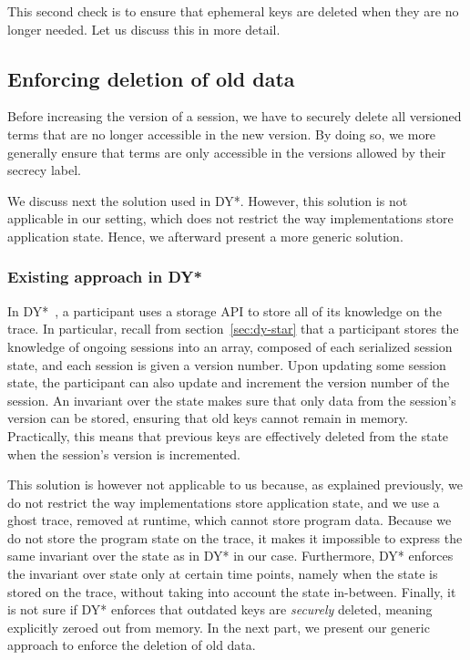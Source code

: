 This second check is to ensure that ephemeral keys are deleted when they are no longer needed. Let us discuss this in more detail.

\subsection{Enforcing deletion of old data}
\label{sec:enforcing-deletion-of-old-data}

Before increasing the version of a session, we have to securely delete all versioned terms that are no longer accessible in the new version. By doing so, we more generally ensure that terms are only accessible in the versions allowed by their secrecy label.

We discuss next the solution used in DY*. However, this solution is not applicable in our setting, which does not restrict the way implementations store application state. Hence, we afterward present a more generic solution.

\subsubsection{Existing approach in DY*}
\label{sec:existing-approach-in-dy}

In DY*~\cite{bhargavan2021text}, a participant uses a storage API to store all of its knowledge on the trace.
In particular, recall from section~\ref{sec:dy-star} that a participant stores the knowledge of ongoing sessions into an array, composed of each serialized session state, and each session is given a version number.
Upon updating some session state, the participant can also update and increment the version number of the session.
An invariant over the state makes sure that only data from the session's version can be stored, ensuring that old keys cannot remain in memory.
Practically, this means that previous keys are effectively deleted from the state when the session's version is incremented.

This solution is however not applicable to us because, as explained previously, we do not restrict the way implementations store application state, and we use a ghost trace, removed at runtime, which cannot store program data.
Because we do not store the program state on the trace, it makes it impossible to express the same invariant over the state as in DY* in our case.
Furthermore, DY* enforces the invariant over state only at certain time points, namely when the state is stored on the trace, without taking into account the state in-between.
Finally, it is not sure if DY* enforces that outdated keys are \emph{securely} deleted, meaning explicitly zeroed out from memory.
In the next part, we present our generic approach to enforce the deletion of old data.


